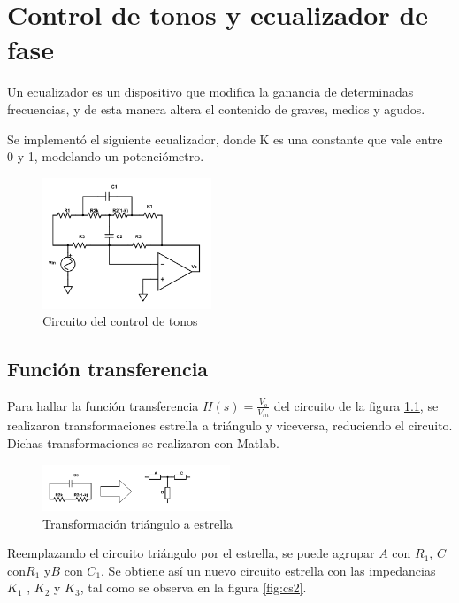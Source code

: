 \documentclass[../../tc_tp3_main.tex]{subfiles}
\begin{document}
\chapter{Control de tonos y ecualizador de fase}

Un ecualizador es un dispositivo que modifica la ganancia de determinadas frecuencias, y de esta manera altera el contenido de graves, medios y agudos.
\par
Se implementó el siguiente ecualizador, donde K es una constante que vale entre 0 y 1, modelando un potenciómetro.

\begin{figure}[H]
\centering
\includegraphics[width=0.45\textwidth]{imagenes/circuitoControlTonos.png}
\caption{Circuito del control de tonos} \label{fig:cct}
\end{figure}




\section{Función transferencia}

Para hallar la función transferencia $H(s)=\frac{V_{o}}{V_{in}}$ del circuito de la figura \ref{fig:cct}, se realizaron transformaciones estrella a tri\'angulo y viceversa, reduciendo el circuito. Dichas transformaciones se realizaron con Matlab.



\begin{figure}[H]
\centering
\includegraphics[width=0.5\textwidth]{imagenes/simpl1.png}
\caption{Transformación tri\'angulo a estrella} \label{fig:cs1}
\end{figure}

Reemplazando el circuito tri\'angulo por el estrella, se puede agrupar $A$ con $R_1$, $C$ con$ R_1$ y$ B$ con $C_1$. Se obtiene as\'i un nuevo circuito estrella con las impedancias $ K_1$ , $K_2$ y  $K_3$, tal como se observa en la figura \ref{fig:cs2}.
\end{document}
